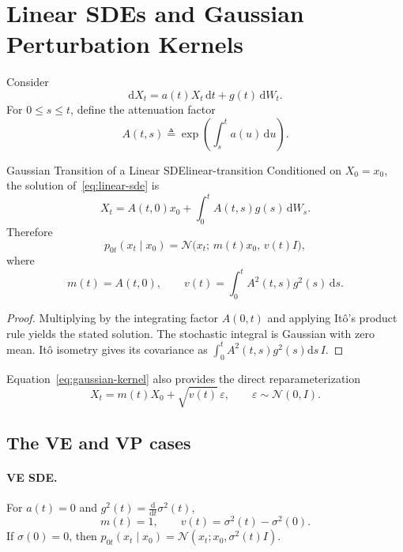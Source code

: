 \documentclass[11pt,a4paper]{article}
\renewcommand{\d}{\mathrm{d}}
\newcommand{\cN}{\mathcal{N}}
\begin{document}
\section{Linear SDEs and Gaussian Perturbation Kernels}\label{sec:marginals}

Consider
\begin{equation}\label{eq:linear-sde}
  \d X_t=a(t)X_t\,\d t+g(t)\,\d W_t.
\end{equation}
For $0\le s\le t$, define the attenuation factor
\[
  A(t,s)\triangleq\exp\!\left(\int_s^t a(u)\,\d u\right).
\]

\begin{proposition}{Gaussian Transition of a Linear SDE}{linear-transition}
Conditioned on $X_0=x_0$, the solution of~\eqref{eq:linear-sde} is
\[
  X_t=A(t,0)x_0+\int_0^t A(t,s)g(s)\,\d W_s.
\]
Therefore
\begin{equation}\label{eq:gaussian-kernel}
  p_{0t}(x_t\mid x_0)
  =\cN\!\bigl(x_t;\,m(t)x_0,\,v(t)I\bigr),
\end{equation}
where
\begin{equation}\label{eq:mean-var}
  m(t)=A(t,0),
  \qquad
  v(t)=\int_0^t A^2(t,s)g^2(s)\,\d s.
\end{equation}
\end{proposition}

\begin{proof}
Multiplying by the integrating factor $A(0,t)$ and applying It\^o's product
rule yields the stated solution.  The stochastic integral is Gaussian with
zero mean.  It\^o isometry gives its covariance as
$\int_0^t A^2(t,s)g^2(s)\d s\,I$.
\end{proof}

Equation~\eqref{eq:gaussian-kernel} also provides the direct reparameterization
\begin{equation}\label{eq:reparam}
  X_t=m(t)X_0+\sqrt{v(t)}\,\varepsilon,
  \qquad \varepsilon\sim\cN(0,I).
\end{equation}

\subsection{The VE and VP cases}

\paragraph{VE SDE.}
For $a(t)=0$ and $g^2(t)=\frac{\d}{\d t}\sigma^2(t)$,
\[
  m(t)=1,
  \qquad
  v(t)=\sigma^2(t)-\sigma^2(0).
\]
If $\sigma(0)=0$, then
$p_{0t}(x_t\mid x_0)=\cN(x_t;x_0,\sigma^2(t)I)$.
\end{document}
